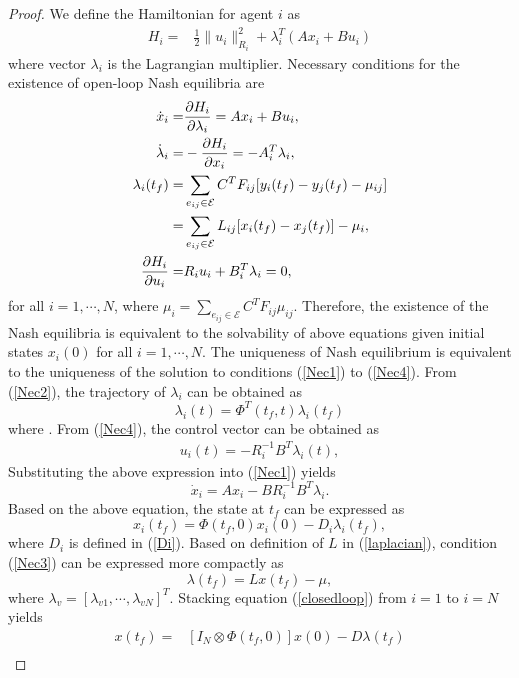 \documentclass[12pt,draftcls,onecolumn]{IEEEtran}  %
\begin{document}
\begin{proof}
We define the Hamiltonian for agent $i$ as
\begin{align}
H_i=&\frac{1}{2}\|u_i\|^2_{R_i}+ \lambda_{i}^T(Ax_i+Bu_i)
\end{align}
where vector $\lambda_i$ is the Lagrangian multiplier. Necessary conditions for the existence of open-loop Nash equilibria are
\begin{subequations}\begin{align}
\dot{x}_{i}=&\frac{\partial H_i}{\partial \lambda_{i}}=Ax_i+Bu_i,\label{Nec1}\\ 
\dot{\lambda}_{i}=&-\frac{\partial H_i}{\partial x_{i}}= -A_i^T\lambda_i,\label{Nec2}\\
\lambda_{i}(t_f)=& \sum_{e_{ij}\in\mathcal{E}} C^TF_{ij}[y_i(t_f)-y_j(t_f)-\mu_{ij}]\notag\\
=& \sum_{e_{ij}\in\mathcal{E}} L_{ij}[x_i(t_f)-x_j(t_f)]-\mu_i,\label{Nec3}\\
\frac{\partial H_i}{\partial u_i}=&R_iu_i+B^T_i\lambda_i =0,\label{Nec4}
\end{align}
\end{subequations}
for all $i=1,\cdots,N$, where $\mu_i=\sum_{e_{ij}\in\mathcal{E}}C^TF_{ij}\mu_{ij}$. Therefore, the existence of the Nash equilibria is equivalent to the solvability of above equations given initial states $x_i(0)$ for all $i=1,\cdots,N$. The uniqueness of Nash equilibrium is equivalent to the uniqueness of the solution to conditions (\ref{Nec1}) to (\ref{Nec4}). From (\ref{Nec2}), the trajectory of $\lambda_i$ can be obtained as
\[\lambda_i(t)=\Phi^T(t_f,t)\lambda_i(t_f)\]
where . From (\ref{Nec4}), the control vector can be obtained as
\begin{align}
u_i(t)=-R_i^{-1}B^T\lambda_i(t),\label{ulambda}
\end{align}
Substituting the above expression into (\ref{Nec1}) yields
\[\dot{x}_i=Ax_i-BR_i^{-1}B^T\lambda_i.\]
Based on the above equation, the state at $t_f$ can be expressed as
\begin{equation}
x_i(t_f)=\Phi(t_f,0)x_i(0)- D_i\lambda_i(t_f),\label{closedloop}
\end{equation}
where $D_i$ is defined in (\ref{Di}). Based on definition of $L$ in (\ref{laplacian}), condition (\ref{Nec3}) can be expressed more compactly as
\[\lambda(t_f)=Lx(t_f)-\mu,\]
where $\lambda_v=[\lambda_{v1},\cdots,\lambda_{vN}]^T$. Stacking equation (\ref{closedloop}) from $i=1$ to $i=N$ yields
\begin{align*}
x(t_f)=&[I_N\otimes \Phi(t_f,0)]x(0)-D\lambda(t_f)\\

\end{align*}
\end{proof}
\end{document}
